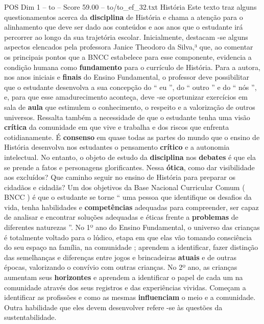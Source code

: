\begin{textsample}{POS Dim 1 – to – Score 59.00 – to/to\_ef\_32.txt}  \label{ex:f1_pos_254}
História Este texto traz alguns questionamentos acerca da \textbf{disciplina} de História e chama a atenção para o alinhamento que deve ser dado aos conteúdos e aos anos que o estudante irá percorrer ao longo da sua trajetória escolar.
Inicialmente, destacam -se alguns aspectos elencados pela professora Janice Theodoro da Silva,³ que, ao comentar os principais pontos que a BNCC estabelece para esse componente, evidencia a condição humana como \textbf{fundamento} para o currículo de História.
Para a autora, nos anos iniciais e \textbf{finais} do Ensino Fundamental, o professor deve possibilitar que o estudante desenvolva a sua concepção do “ eu ”, do “ outro ” e do “ nós ”, e, para que esse amadurecimento aconteça, deve -se oportunizar exercícios em sala de \textbf{aula} que estimulem o conhecimento, o respeito e a valorização de outros universos.
Ressalta também a necessidade de que o estudante tenha uma visão \textbf{crítica} da comunidade em que vive e trabalha e dos riscos que enfrenta cotidianamente.
É \textbf{consenso} em quase todas as partes do mundo que o ensino de História desenvolva nos estudantes o pensamento \textbf{crítico} e a autonomia intelectual.
No entanto, o objeto de estudo da \textbf{disciplina} nos \textbf{debates} é que ela se prende a fatos e personagens glorificantes.
Nessa \textbf{ótica}, como dar visibilidade aos excluídos?
Que caminho seguir no ensino de História para preparar os cidadãos e cidadãs?
Um dos objetivos da Base Nacional Curricular Comum ( BNCC ) é que o estudante se torne “ uma pessoa que identifique os desafios da vida, tenha habilidades e \textbf{competências} adequadas para compreender, ser capaz de analisar e encontrar soluções adequadas e éticas frente a \textbf{problemas} de diferentes naturezas ”.
No 1º ano do Ensino Fundamental, o universo das crianças é totalmente voltado para o lúdico, etapa em que elas vão tomando consciência do seu espaço na família, na comunidade ; aprendem a identificar, fazer distinção das semelhanças e diferenças entre jogos e brincadeiras \textbf{atuais} e de outras épocas, valorizando o convívio com outras crianças.
No 2º ano, as crianças aumentam seus \textbf{horizontes} e aprendem a identificar o papel de cada um na comunidade através dos seus registros e das experiências vividas.
Começam a identificar as profissões e como as mesmas \textbf{influenciam} o meio e a comunidade.
Outra habilidade que eles devem desenvolver refere -se às questões da sustentabilidade.

\end{textsample}
